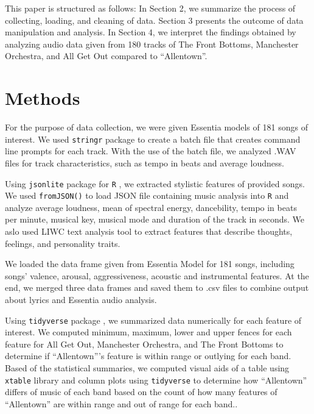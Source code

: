 \documentclass{article}\usepackage[]{graphicx}\usepackage[]{xcolor}
\begin{document}
\begin{multicols}{2}
This paper is structured as follows: In Section 2, we summarize the process of collecting, loading, and cleaning of data. Section 3 presents the outcome of data manipulation and analysis. In Section 4, we interpret the findings obtained by analyzing audio data given from 180 tracks of The Front Bottoms, Manchester Orchestra, and All Get Out compared to ``Allentown''.

\section{Methods}
For the purpose of data collection, we were given Essentia models \citep{alonso2020tensorflow} of 181 songs of interest. We used \texttt{stringr} package \citep{stringr} to create a batch file that creates command line prompts for each track. With the use of the batch file, we analyzed .WAV files for track characteristics, such as tempo in beats and average loudness.

Using \texttt{jsonlite} package for \texttt{R} \citep{jsonlite}, we extracted stylistic features of provided songs. We used \texttt{fromJSON()} to load JSON file containing music analysis into \texttt{R} and analyze average loudness, mean of spectral energy, dancebility, tempo in beats per minute, musical key, musical mode and duration of the track in seconds. We aslo used LIWC text analysis tool \citep{boyd2022development} to extract features that describe thoughts, feelings, and personality traits.

We loaded the data frame given from Essentia Model for 181 songs, including songs' valence, arousal, aggressiveness, acoustic and instrumental features. At the end, we merged three data frames and saved them to .csv files to combine output about lyrics and Essentia audio analysis. 

Using \texttt{tidyverse} package \citep{tidyverse}, we summarized data numerically for each feature of interest. We computed minimum, maximum, lower and upper fences for each feature for All Get Out, Manchester Orchestra, and The Front Bottoms to determine if ``Allentown'''s feature is within range or outlying for each band. Based of the statistical summaries, we computed visual aids of a table using \texttt{xtable} library \citep{xtable} and column plots using \texttt{tidyverse} to determine how ``Allentown'' differs of music of each band based on the count of how many features of ``Allentown'' are within range and out of range for each band..



\end{multicols}
\end{document}
